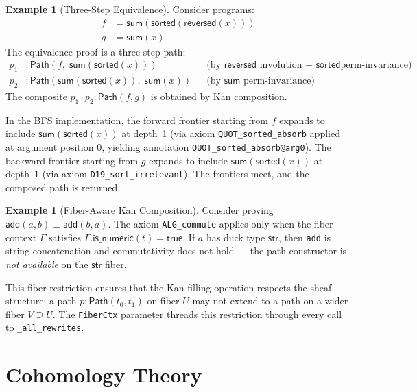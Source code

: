 \documentclass[11pt,a4paper]{report}
\theoremstyle{definition}
\newtheorem{example}[definition]{Example}
\theoremstyle{plain}
\newcommand{\Path}{\mathsf{Path}}
\begin{document}
\begin{example}[Three-Step Equivalence]
\label{ex:three-step}
Consider programs:
\begin{align}
  f &= \mathsf{sum}(\mathsf{sorted}(\mathsf{reversed}(x))) \\
  g &= \mathsf{sum}(x)
\end{align}
The equivalence proof is a three-step path:
\begin{align}
  p_1 &: \Path(f,\; \mathsf{sum}(\mathsf{sorted}(x)))
    && \text{(by $\mathsf{reversed}$ involution + $\mathsf{sorted}$
    perm-invariance)} \\
  p_2 &: \Path(\mathsf{sum}(\mathsf{sorted}(x)),\; \mathsf{sum}(x))
    && \text{(by $\mathsf{sum}$ perm-invariance)}
\end{align}
The composite $p_1 \cdot p_2 : \Path(f, g)$ is obtained by Kan
composition.

In the BFS implementation, the forward frontier starting from $f$
expands to include $\mathsf{sum}(\mathsf{sorted}(x))$ at depth~1
(via axiom \texttt{QUOT\_sorted\_absorb} applied at argument position
0, yielding annotation \texttt{QUOT\_sorted\_absorb@arg0}).  The
backward frontier starting from $g$ expands to include
$\mathsf{sum}(\mathsf{sorted}(x))$ at depth~1 (via axiom
\texttt{D19\_sort\_irrelevant}).  The frontiers meet, and the
composed path is returned.
\end{example}

\begin{example}[Fiber-Aware Kan Composition]
\label{ex:fiber-kan}
Consider proving $\mathsf{add}(a, b) \equiv \mathsf{add}(b, a)$.
The axiom \texttt{ALG\_commute} applies only when the fiber context
$\Gamma$ satisfies $\Gamma.\mathsf{is\_numeric}(t) = \mathsf{true}$.
If $a$ has duck type $\mathsf{str}$, then \texttt{add} is string
concatenation and commutativity does not hold --- the path constructor
is \emph{not available} on the $\mathsf{str}$ fiber.

This fiber restriction ensures that the Kan filling operation respects
the sheaf structure: a path $p : \Path(t_0, t_1)$ on fiber $U$ may
not extend to a path on a wider fiber $V \supseteq U$.  The
\texttt{FiberCtx} parameter threads this restriction through every
call to \texttt{\_all\_rewrites}.
\end{example}


\part{Cohomology Theory}
\end{document}
